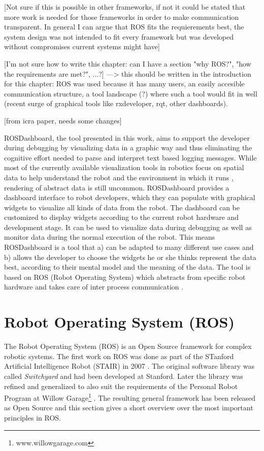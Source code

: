 [Not sure if this is possible in other frameworks, if not it could be stated that more work is needed for those frameworks in order to make communication transparent. In general I can argue that ROS fits the requierements best, the system design was not intended to fit every framework but was developed without compromises current systems might have]

[I'm not sure how to write this chapter: can I have a section "why ROS?", "how the requirements are met?", ...?] ---> this should be written in the introduction for this chapter: ROS was used because it has many users, an easily accesible communication structure, a tool landscape (?) where such a tool would fit in well (recent surge of graphical tools like rxdeveloper, rqt, other dashboards).

\parbox{.8\linewidth}{
[from icra paper, needs some changes]

ROSDashboard, the tool presented in this work, aims to support the developer during debugging by visualizing data in a graphic way and thus eliminating the cognitive effort needed to parse and interpret text based logging messages. While most of the currently available visualization tools in robotics focus on spatial data to help understand the robot and the environment in which it runs \cite{Collett2010, Quigley2009}, rendering of abstract data is still uncommon. ROSDashboard provides a dashboard interface to robot developers, which they can populate with graphical widgets to visualize all kinds of data from the robot. The dashboard can be customized to display widgets according to the current robot hardware and development stage. It can be used to visualize data during debugging as well as monitor data during the normal execution of the robot. This means ROSDashboard is a tool that a) can be adapted to many different use cases and b) allows the developer to choose the widgets he or she thinks represent the data best, according to their mental model and the meaning of the data. The tool is based on ROS (Robot Operating System) which abstracts from specific robot hardware and takes care of inter process communication \cite{Quigley2009}.
}

\section{Robot Operating System (ROS)}
The Robot Operating System (ROS) is an Open Source framework for complex robotic systems. The first work on ROS was done as part of the STanford Artificial Intelligence Robot (STAIR) in 2007 \cite{Quigley2007}. The original software library was called \emph{Switchyard} and had been developed at Stanford. Later the library was refined and generalized to also suit the requirements of the Personal Robot Program at Willow Garage\footnote{www.willowgarage.com} \cite{Quigley2009}. The resulting general framework has been released as Open Source \cite{Quigley2009} and this section gives a short overview over the most important principles in ROS.

